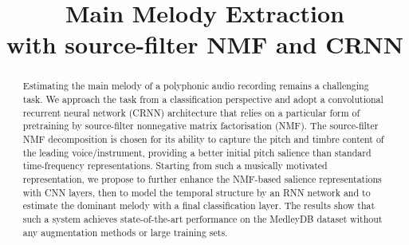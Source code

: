 \documentclass{article}
\title{Main Melody Extraction \\ with source-filter NMF and CRNN}
\begin{document}
\def\WFz{\mathbf{W}^{F_{0}}}
\def\WFzf{\underline{\mathbf{W}}^{F_{0}}}
\def\HFz{\mathbf{H}^{F_{0}}}
\def\HFzf{\underline{\mathbf{H}}^{F_{0}}}
\def\Wphi{\mathbf{W}^{\Phi}}
\def\Wphif{\underline{\mathbf{W}}^{\Phi}}
\def\Hphi{\mathbf{H}^{\Phi}}
\def\Hphif{\underline{\mathbf{H}}^{\Phi}}
\def\Wgamma{\mathbf{W}^{\Gamma}}
\def\Wgammaf{\underline{\mathbf{W}}^{\Gamma}}
\def\Hgamma{\mathbf{H}^{\Gamma}}
\def\Hgammaf{\underline{\mathbf{H}}^{\Gamma}}
\def\WB{\mathbf{W}^{B}}
\def\WBf{\underline{\mathbf{W}}^{B}}
\def\HB{\mathbf{H}^{B}}
\def\HBf{\underline{\mathbf{H}}^{B}}
\def\V{\mathbf{V}}
\def\Vhat{\mathbf{\hat{V}}}
\def\v{\mathbf{v}}
\def\vhat{\mathbf{\hat{v}}}
\def\bhphi{\mathbf{h}^{\Phi}}
\def\hphi{h^{\Phi}}
\def\hphit{\tilde{h}^{\Phi}}
\def\hgamma{h^{\Gamma}}
\def\hgammat{\tilde{h}^{\Gamma}}
\def\wgamma{w^{\Gamma}}
\def\wphi{w^{\Phi}}
\def\wphit{\tilde{w}^{\Phi}}
\def\hFz{h^{F_0}}
\def\hFzt{\tilde{h}^{F_0}}
\def\hB{h^{B}}
\def\hBt{\tilde{h}^{B}}
\def\wB{w^{B}}
\def\wBt{\tilde{w}^{B}}
\def\bhphit{\mathbf{\tilde{h}}^{\Phi}}
\def\Hphit{\mathbf{\tilde{H}}^{\Phi}}
\def\HFzt{\mathbf{\tilde{H}}^{F_{0}}}
\def\HBt{\mathbf{\tilde{H}}^{B}}
\def\WBt{\mathbf{\tilde{W}}^{B}}
\def\Hgammat{\mathbf{\tilde{H}}^{\Gamma}}
\def\Wphit{\mathbf{\tilde{W}}^{\Phi}}
\def\vt{\tilde{v}}
\newcommand{\RR}{\mathbb{R}}
\def\sFz{s^{F_{0}}}
\def\sB{s^{B}}
\def\sphi{s^{\Phi}}
\def\VFz{\mathbf{V}^{F_0}}
\def\Vphi{\mathbf{V}^{\Phi}}
\def\VB{\mathbf{V}^{B}}
\newcommand{\conv}[1]{\smash{\overset{\scriptscriptstyle\smile}{#1}}}
\newcommand{\conc}[1]{\smash{\overset{\scriptscriptstyle\frown}{#1}}}
\def\G{\mathcal{G}}

%
\maketitle
%
\begin{abstract}
Estimating the main melody of a polyphonic audio recording remains a challenging task.
We approach the task from a classification perspective and adopt a convolutional recurrent neural network (CRNN) architecture that relies on a particular form of pretraining by source-filter nonnegative matrix factorisation (NMF). 
The source-filter NMF decomposition is chosen for its ability to capture the pitch and timbre content of the leading voice/instrument, providing a better initial pitch salience than standard time-frequency representations. 
Starting from such a musically motivated representation, we propose to further enhance the NMF-based salience representations with CNN layers, then to model the temporal structure by an RNN network and to estimate the dominant melody with a final classification layer. 
The results show that such a system achieves state-of-the-art performance on the MedleyDB dataset without any augmentation methods or large training sets. 
\end{abstract}
%
\end{document}
